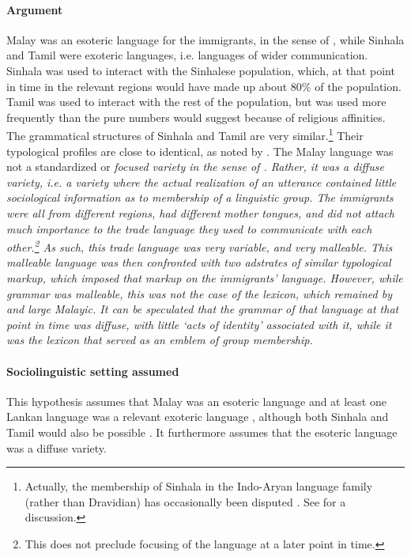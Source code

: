 \paragraph{Argument}
Malay was an esoteric language for the immigrants, in the sense of \citet{Ross1996}, while Sinhala and Tamil were exoteric languages, i.e. languages of wider communication. Sinhala was used to interact with the Sinhalese population, which, at that point in time in the relevant regions would have made up about 80\% of the population. Tamil was used to interact with the rest of the population, but was used more frequently than the pure numbers would suggest because of religious affinities. The grammatical structures of Sinhala and Tamil are very similar.\footnote{Actually, the membership of Sinhala in the Indo-Aryan language family (rather than Dravidian) has occasionally been disputed \citep{Lassen1847,Tennent1859}. See \citet{Geiger1938} for a discussion.} Their typological profiles are close to identical, as noted by \citet{SmithRH}. The Malay language was not a standardized or \em  focused \em variety in the sense of \citet{LePageEtAl1985}. Rather, it  was a \em diffuse \em variety, i.e. a variety where the actual realization of an utterance contained little sociological information as to membership of a linguistic group. The immigrants were all  from different regions, had different mother tongues, and did not attach much importance to the trade language they used to communicate with each other.\footnote{This does not preclude focusing of the language at a later point in time.} As such, this trade language was very variable, and very malleable. This malleable language was then confronted with two adstrates of similar typological markup, which imposed that markup on the immigrants' language. However, while grammar was malleable, this was not the case of the lexicon, which remained by and large Malayic. It can be speculated that the grammar of that language at that point in time was diffuse, with little `acts of identity' \citep{LePageEtAl1985} associated with it, while it was the lexicon that served as an emblem of group membership.

\paragraph{Sociolinguistic setting assumed}
This hypothesis assumes that Malay was an esoteric language and at least one Lankan language was a relevant exoteric language \citep[Tamil in the case of][]{Bakker1995nl,Bakker1996stuf,Bakker2000convergence,Bakker2000rapid,Bakker2006}, although both Sinhala and Tamil would also be possible \citep{Ansaldo2005ms,Ansaldo2008genesis}. It furthermore assumes that the esoteric language was a diffuse variety.

